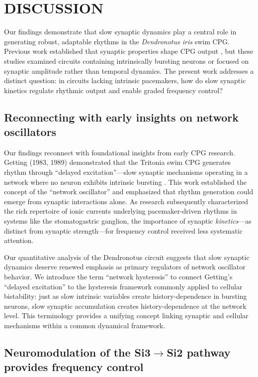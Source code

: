 \section*{DISCUSSION}

Our findings demonstrate that slow synaptic dynamics play a central role in generating robust, adaptable rhythms in the \textit{Dendronotus iris} swim CPG.
Previous work established that synaptic properties shape CPG output \cite{Manor1997, NadimBucher2014}, but these studies examined circuits containing intrinsically bursting neurons or focused on synaptic amplitude rather than temporal dynamics.
The present work addresses a distinct question: in circuits lacking intrinsic pacemakers, how do slow synaptic kinetics regulate rhythmic output and enable graded frequency control?

\subsection*{Reconnecting with early insights on network oscillators}

Our findings reconnect with foundational insights from early CPG research.
Getting (1983, 1989) demonstrated that the Tritonia swim CPG generates rhythm through ``delayed excitation''---slow synaptic mechanisms operating in a network where no neuron exhibits intrinsic bursting \cite{Getting1983delayed, Getting1983network, Getting1989}.
This work established the concept of the ``network oscillator'' and emphasized that rhythm generation could emerge from synaptic interactions alone.
As research subsequently characterized the rich repertoire of ionic currents underlying pacemaker-driven rhythms in systems like the stomatogastric ganglion, the importance of synaptic \textit{kinetics}---as distinct from synaptic strength---for frequency control received less systematic attention.

Our quantitative analysis of the Dendronotus circuit suggests that slow synaptic dynamics deserve renewed emphasis as primary regulators of network oscillator behavior.
We introduce the term ``network hysteresis'' to connect Getting's ``delayed excitation'' to the hysteresis framework commonly applied to cellular bistability: just as slow intrinsic variables create history-dependence in bursting neurons, slow synaptic accumulation creates history-dependence at the network level.
This terminology provides a unifying concept linking synaptic and cellular mechanisms within a common dynamical framework.

\subsection*{Neuromodulation of the Si3$\to$Si2 pathway provides frequency control}

